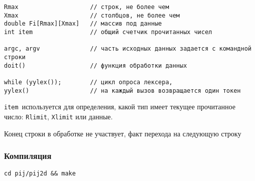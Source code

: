 
\begin{verbatim}
Rmax 					// строк, не более чем 
Xmax 					// столбцов, не более чем
double Fi[Rmax][Xmax]	// массив под данные
int item				// общий счетчик прочитанных чисел

argc, argv				// часть исходных данных задается с командной строки
doit()					// функция обработки данных

while (yylex());		// цикл опроса лексера,
yylex()					// на каждый вызов возвращается один токен
\end{verbatim}

\verb|item|\ используется для определения, какой тип имеет текущее 
прочитанное число: \verb|Rlimit|, \verb|Xlimit| или данные.

Конец строки в обработке не участвует, факт перехода на следующую строку

\subsubsection{Компиляция}

\verb|cd pij/pij2d && make|


\secup


